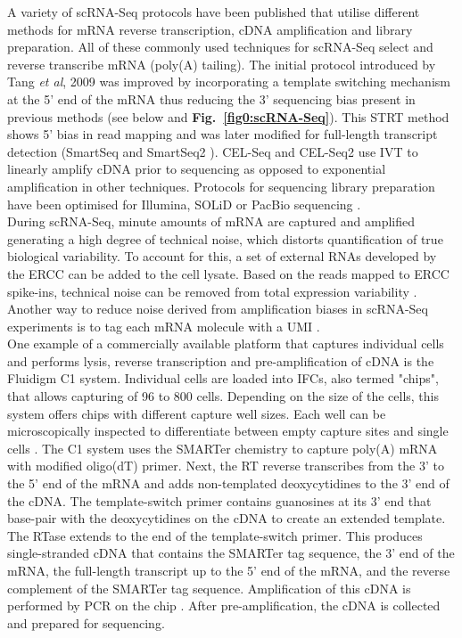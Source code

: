 A variety of scRNA-Seq protocols have been published that utilise different methods for mRNA reverse transcription, \gls{cDNA} amplification and library preparation. All of these commonly used techniques for scRNA-Seq select and reverse transcribe mRNA (poly(A) tailing). The initial protocol introduced by Tang \textit{et al}, 2009 \citep{Tang2009} was improved by incorporating a template switching mechanism at the 5' end of the mRNA thus reducing the 3' sequencing bias present in previous methods \citep{Islam2011} (see below and \textbf{Fig.~\ref{fig0:scRNA-Seq}}). This \gls{STRT} method shows 5' bias in read mapping and was later modified for full-length transcript detection (SmartSeq \citep{Ramskold2012} and SmartSeq2 \citep{Picelli2013}). CEL-Seq \citep{Hashimshony2012} and CEL-Seq2 \citep{Hashimshony2016} use \gls{IVT} to linearly amplify cDNA prior to sequencing as opposed to exponential amplification in other techniques. Protocols for sequencing library preparation have been optimised for Illumina, SOLiD or PacBio sequencing \citep{Kolodziejczyk2015review}. \\

During scRNA-Seq, minute amounts of mRNA are captured and amplified generating a high degree of technical noise, which distorts quantification of true biological variability. To account for this, a set of external RNAs developed by the \gls{ERCC} \citep{Rna2005} can be added to the cell lysate. Based on the reads mapped to ERCC spike-ins, technical noise can be removed from total expression variability \citep{Brennecke2013, Vallejos2015BASiCS}. Another way to reduce noise derived from amplification biases in scRNA-Seq experiments is to tag each mRNA molecule with a \gls{UMI} \citep{Kivioja2011, Islam2014}.\\

One example of a commercially available platform that captures individual cells and performs lysis, reverse transcription and pre-amplification of cDNA is the Fluidigm\textsuperscript{\textregistered{}} C1 system. Individual cells are loaded into \glspl{IFC}, also termed "chips", that allows capturing of 96 to 800 cells. Depending on the size of the cells, this system offers chips with different capture well sizes. Each well can be microscopically inspected to differentiate between empty capture sites and single cells \citep{Kolodziejczyk2015review}. The C1 system uses the SMARTer\textsuperscript{\textregistered{}} chemistry to capture poly(A) mRNA with modified oligo(dT) primer. Next, the \gls{RT} reverse transcribes from the 3' to the 5' end of the mRNA and adds non-templated deoxycytidines to the 3' end of the cDNA. The template-switch primer contains guanosines at its 3' end that base-pair with the deoxycytidines on the cDNA to create an extended template. The \gls{RTase} extends to the end of the template-switch primer. This produces single-stranded cDNA that contains the SMARTer tag sequence, the 3' end of the mRNA, the full-length transcript up to the 5' end of the mRNA, and the reverse complement of the SMARTer tag sequence. Amplification of this cDNA is performed by PCR on the chip \cite{Fluidigm2015}. After pre-amplification, the cDNA is collected and prepared for sequencing.\\

